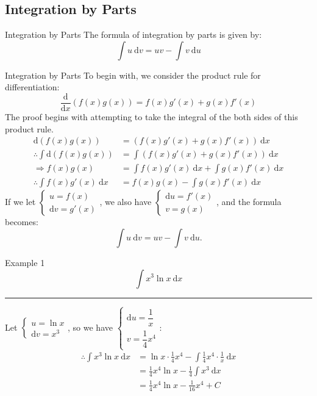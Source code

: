 \documentclass[12pt,a4paper]{article}
\def\d{{\mathrm{d}}}
\def\qed{\rightline{$\blacksquare$}}
\begin{document}
\subsection{Integration by Parts}
\begin{df}{Integration by Parts}
	The formula of integration by parts is given by: 
	$$\int u\ \d v=uv-\int v\ \d u$$
\end{df}
\begin{prf}{Integration by Parts}
	To begin with, we consider the product rule for differentiation: 
	$$\frac{\d}{\d x}\left(f(x)g(x)\right)=f(x)g'(x)+g(x)f'(x)$$
	The proof begins with attempting to take the integral of the both sides of this product rule.
	$$\begin{aligned}
		\d\left(f(x)g(x)\right)&=\left(f(x)g'(x)+g(x)f'(x)\right)\ \d x\\
		\therefore \int \d\left(f(x)g(x)\right)&=\int\left(f(x)g'(x)+g(x)f'(x)\right)\ \d x\\
		\Rightarrow f(x)g(x)&=\boxed{\int f(x)g'(x)\ \d x}+\int g(x)f'(x)\ \d x\\
		\therefore \int f(x)g'(x)\ \d x&=f(x)g(x)-\int g(x)f'(x)\ \d x
	\end{aligned}$$
	If we let $\begin{cases}u=f(x)\\\d v=g'(x)\end{cases}$, we also have $\begin{cases}\d u=f'(x)\\v=g(x)\end{cases}$, and the formula becomes: 
	$$\int u\ \d v=uv-\int v\ \d u. $$ \qed
\end{prf}
\begin{eg}{Example 1}
	$$\int x^3\ln x\ \d x$$
	\noindent\rule[0.25\baselineskip]{\textwidth}{1pt}
	Let $\begin{cases}u=\ln x\\ \d v=x^3\end{cases}$, so we have $\begin{cases}\d u=\dfrac{1}{x}\\ v=\dfrac{1}{4}x^4\end{cases}$: 
	$$\begin{aligned}
		\therefore \int x^3\ln x\ \d x&=\ln x\cdot\frac{1}{4}x^4-\int\frac{1}{4}x^4\cdot\frac{1}{x}\ \d x\\
		&=\frac{1}{4}x^4\ln x-\frac{1}{4}\int x^3\ \d x\\
		&=\frac{1}{4}x^4\ln x-\frac{1}{16}x^4+C
	\end{aligned}$$
\end{eg}
\end{document}
